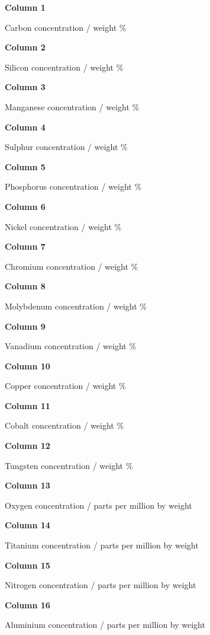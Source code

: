 \medskip
\item{} {\bf Column 1} 
\item{} \indent Carbon concentration / weight \%
\medskip
\item{} {\bf Column 2} 
\item{} \indent Silicon concentration / weight \%
\medskip
\item{} {\bf Column 3} 
\item{} \indent Manganese concentration / weight \%
\medskip
\item{} {\bf Column 4} 
\item{} \indent Sulphur concentration / weight \%
\medskip
\item{} {\bf Column 5} 
\item{} \indent Phosphorus concentration / weight \%
\medskip
\item{} {\bf Column 6} 
\item{} \indent Nickel concentration / weight \%
\medskip
\item{} {\bf Column 7} 
\item{} \indent Chromium concentration / weight \%
\medskip
\item{} {\bf Column 8} 
\item{} \indent Molybdenum concentration / weight \%
\medskip
\item{} {\bf Column 9} 
\item{} \indent Vanadium concentration / weight \%
\medskip
\item{} {\bf Column 10} 
\item{} \indent Copper concentration / weight \%
\medskip
\item{} {\bf Column 11} 
\item{} \indent Cobalt concentration / weight \%
\medskip
\item{} {\bf Column 12} 
\item{} \indent Tungsten concentration / weight \%
\medskip
\item{} {\bf Column 13} 
\item{} \indent Oxygen concentration / parts per million by weight
\medskip
\item{} {\bf Column 14} 
\item{} \indent Titanium concentration / parts per million by weight
\medskip
\item{} {\bf Column 15} 
\item{} \indent Nitrogen concentration / parts per million by weight
\medskip
\item{} {\bf Column 16} 
\item{} \indent Aluminium concentration / parts per million by weight
